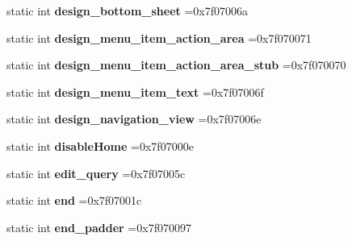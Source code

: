 \begin{DoxyCompactItemize}
\mbox{\label{classandroid_1_1support_1_1v4_1_1R_1_1id_ab6886fd0fd44fec5c5b13ea39faf5f82}} 
static int {\bfseries design\+\_\+bottom\+\_\+sheet} =0x7f07006a
\item 
\mbox{\label{classandroid_1_1support_1_1v4_1_1R_1_1id_a4d07f4556f1239473952a0107dff1db8}} 
static int {\bfseries design\+\_\+menu\+\_\+item\+\_\+action\+\_\+area} =0x7f070071
\item 
\mbox{\label{classandroid_1_1support_1_1v4_1_1R_1_1id_a7a321816ea026e53f61e2869007e3338}} 
static int {\bfseries design\+\_\+menu\+\_\+item\+\_\+action\+\_\+area\+\_\+stub} =0x7f070070
\item 
\mbox{\label{classandroid_1_1support_1_1v4_1_1R_1_1id_a8dfa22edeb47c10fc44d1b18fbe8cedc}} 
static int {\bfseries design\+\_\+menu\+\_\+item\+\_\+text} =0x7f07006f
\item 
\mbox{\label{classandroid_1_1support_1_1v4_1_1R_1_1id_af01c84f5512fb75151a366f5b2abae77}} 
static int {\bfseries design\+\_\+navigation\+\_\+view} =0x7f07006e
\item 
\mbox{\label{classandroid_1_1support_1_1v4_1_1R_1_1id_a50fb0905445cc75404e5c94568220960}} 
static int {\bfseries disable\+Home} =0x7f07000e
\item 
\mbox{\label{classandroid_1_1support_1_1v4_1_1R_1_1id_a76433b6ef78c150a6c27acc171b3f749}} 
static int {\bfseries edit\+\_\+query} =0x7f07005c
\item 
\mbox{\label{classandroid_1_1support_1_1v4_1_1R_1_1id_afba74cf2fe9f4927ed3da70f2c0651f0}} 
static int {\bfseries end} =0x7f07001c
\item 
\mbox{\label{classandroid_1_1support_1_1v4_1_1R_1_1id_a496e968759c2448bd0282ad27a3e78d6}} 
static int {\bfseries end\+\_\+padder} =0x7f070097
\item 

\end{DoxyCompactItemize}
